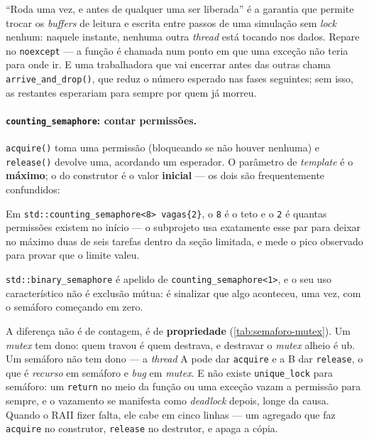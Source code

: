 ``Roda uma vez, e antes de qualquer uma ser liberada'' é a garantia que permite
trocar os \emph{buffers} de leitura e escrita entre passos de uma simulação sem
\emph{lock} nenhum: naquele instante, nenhuma outra \emph{thread} está tocando
nos dados. Repare no \texttt{noexcept} --- a função é chamada num ponto em que
uma exceção não teria para onde ir. E uma trabalhadora que vai encerrar antes
das outras chama \texttt{arrive\_and\_drop()}, que reduz o número esperado nas
fases seguintes; sem isso, as restantes esperariam para sempre por quem já
morreu.

\paragraph{\texttt{counting\_semaphore}: contar permissões.}
\texttt{acquire()} toma uma permissão (bloqueando se não houver nenhuma) e
\texttt{release()} devolve uma, acordando um esperador. O parâmetro de
\emph{template} é o \textbf{máximo}; o do construtor é o valor \textbf{inicial}
--- os dois são frequentemente confundidos:

Em \texttt{std::counting\_semaphore<8> vagas\{2\}}, o \texttt{8} é o teto e o
\texttt{2} é quantas permissões existem no início --- o subprojeto usa exatamente
esse par para deixar no máximo duas de seis tarefas dentro da seção limitada, e
mede o pico observado para provar que o limite valeu.

\texttt{std::binary\_semaphore} é apelido de \texttt{counting\_semaphore<1>}, e
o seu uso característico não é exclusão mútua: é sinalizar que algo aconteceu,
uma vez, com o semáforo começando em zero.

\begin{armadilha}
A diferença não é de contagem, é de \textbf{propriedade}
(\cref{tab:semaforo-mutex}). Um \emph{mutex} tem dono: quem travou é quem
destrava, e destravar o \emph{mutex} alheio é \gls{ub}. Um semáforo não tem dono
--- a \emph{thread} A pode dar \texttt{acquire} e a B dar \texttt{release}, o
que é \emph{recurso} em semáforo e \emph{bug} em \emph{mutex}. E não existe
\texttt{unique\_lock} para semáforo: um \texttt{return} no meio da função ou uma
exceção vazam a permissão para sempre, e o vazamento se manifesta como
\emph{deadlock} depois, longe da causa. Quando o RAII fizer falta, ele cabe em
cinco linhas --- um agregado que faz \texttt{acquire} no construtor,
\texttt{release} no destrutor, e apaga a cópia.
\end{armadilha}

